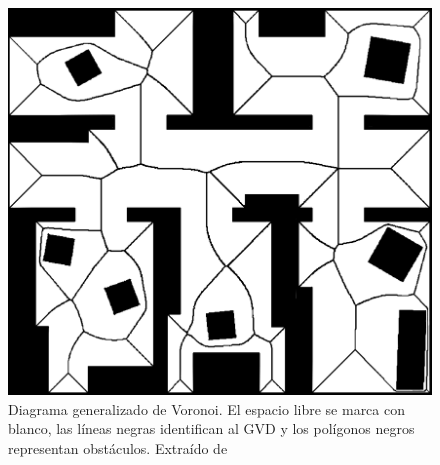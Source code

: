 \begin{figure}[H]
  \centering
  \includegraphics[width=0.45\linewidth]{imagenes/GVD2.png}
  \caption[Diagrama generalizado de Voronoi.]{Diagrama generalizado de Voronoi. El espacio libre se marca con blanco, las líneas negras identifican al GVD y los polígonos negros representan obstáculos. Extraído de \cite{Wallgrun2005}}\label{fig:ejemploGVD}
\end{figure}



